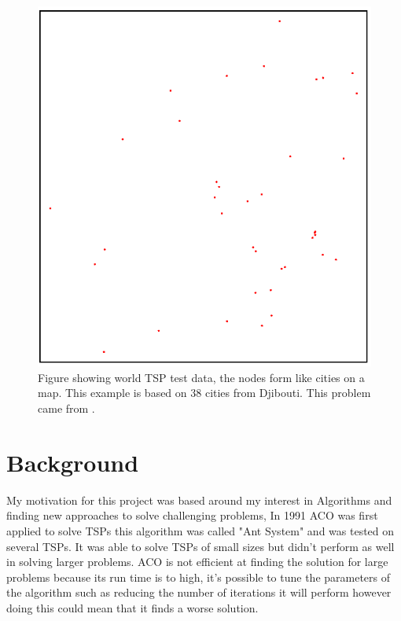 \begin{figure}
    \centering
    \includegraphics[width=\textwidth]{Project Report/LaTeX Template/figures/world_dj38_tsp_data.png}
    \caption{Figure showing world TSP test data, the nodes form like cities on a map. This example is based on 38 cities from Djibouti. This problem came from \cite{dj38_tsp_instance}.}
    \label{fig:world_tsp_data}
\end{figure}

\section{Background}
My motivation for this project was based around my interest in Algorithms and finding new approaches to solve challenging problems, In 1991 ACO was first applied to solve TSPs\cite{dorigo1991distributed} this algorithm was called "Ant System" and was tested on several TSPs. It was able to solve TSPs of small sizes but didn't perform as well in solving larger problems. ACO is not efficient at finding the solution for large problems because its run time is to high, it's possible to tune the parameters of the algorithm such as reducing the number of iterations it will perform however doing this could mean that it finds a worse solution. 

